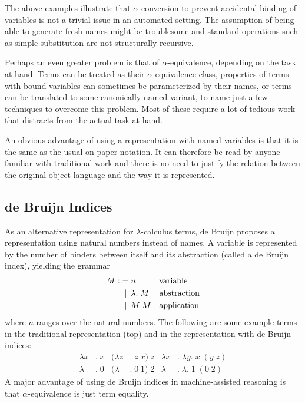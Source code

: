 \documentclass[a4paper,11pt]{article}
\begin{document}
The above examples illustrate that $\alpha$-conversion to prevent
accidental binding of variables is not a trivial issue in an automated
setting.
The assumption of being able to generate fresh names might be troublesome
and standard operations such as simple substitution are not structurally
recursive.

Perhaps an even greater problem is that of $\alpha$-equivalence, depending
on the task at hand.
Terms can be treated as their $\alpha$-equivalence class, properties of
terms with bound variables can sometimes be parameterized by their names,
or terms can be translated to some canonically named variant, to name just
a few techniques to overcome this problem.
Most of these require a lot of tedious work that distracts from the actual
task at hand.

An obvious advantage of using a representation with named variables is
that it is the same as the usual on-paper notation.
It can therefore be read by anyone familiar with traditional work and there
is no need to justify the relation between the original object language and
the way it is represented.


\subsection{de Bruijn Indices}

As an alternative representation for $\lambda$-calculus terms, de Bruijn
\cite{debruijn-72} proposes a representation using natural numbers instead
of names.
A variable is represented by the number of binders between itself and its
abstraction (called a de Bruijn index), yielding the grammar
\begin{align*}
  M ::=             &\; n
  && \text{variable} \\
  \llap{\textbar\:} &\; \lambda . \; M
  && \text{abstraction} \\
  \llap{\textbar\:} &\; M \; M
  && \text{application}
\end{align*}
where $n$ ranges over the natural numbers.
The following are some example terms in the traditional representation
(top) and in the representation with de Bruijn indices:
\begin{align*}
  \lambda x&. \; x & (\lambda z&. \; z \; x) \; z & \lambda x&. \; \lambda y. \; x \; (y \; z)\\
  \lambda &. \; 0  & (\lambda &. \; 0 \; 1) \; 2  & \lambda &. \; \lambda . \; 1 \; (0 \; 2)
\end{align*}
A major advantage of using de Bruijn indices in machine-assisted
reasoning is that $\alpha$-equivalence is just term equality.
\end{document}
